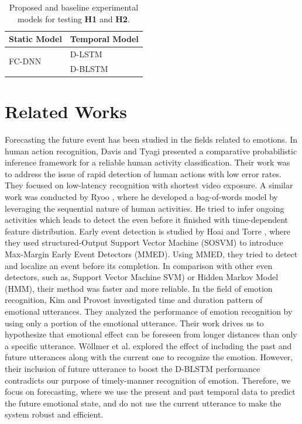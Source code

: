 \begin{table}[h]
\centering
\caption{Proposed and baseline experimental models for testing \textbf{H1} and \textbf{H2}.}
\begin{tabular}{ l l}
\hline
\textbf{Static Model } & \textbf{Temporal Model} \\
\hline
\hline
\multirow{2}{*}{FC-DNN} & D-LSTM \\
          & D-BLSTM \\
\hline
\end{tabular}
\label{table:models}
\end{table}

\newpage
\section{Related Works}
\label{related_works}
Forecasting the future event has been studied in the fields related to emotions. In human action recognition, Davis and  Tyagi \cite{Davis:2006:MHA:1709251.1709302} presented a comparative probabilistic inference framework for a reliable human activity classification. Their work was to address the issue of rapid detection of human actions with low error rates. They focused on low-latency recognition with shortest video exposure. A similar work was conducted by Ryoo \cite{Ryoo:2011:HAP:2355573.2356280}, where he developed a bag-of-words model by leveraging the sequential nature of human activities. He tried to infer ongoing activities which leads to detect the even before it finished with time-dependent feature distribution. Early event detection is studied by Hoai and Torre \cite{MMED}, where they used structured-Output Support Vector Machine (SOSVM) to introduce Max-Margin Early Event Detectors (MMED). Using MMED, they tried to detect and localize an event before its completion. In comparison with other even detectors, such as, Support Vector Machine SVM) or Hidden Markov Model (HMM), their method was faster and more reliable. In the field of emotion recognition, Kim and Provost \cite{Kim2016EmotionSD} investigated time and duration pattern of emotional utterances. They analyzed the performance of emotion recognition by using only a portion of the emotional utterance. Their work drives us to hypothesize that emotional effect can be foreseen from longer distances than only a specific utterance. W\"{o}llmer et al. \cite{Meta2} explored the effect of including the past and future utterances along with the current one to recognize the emotion. However, their inclusion of future utterance to boost the D-BLSTM performance contradicts our purpose of timely-manner recognition of emotion. Therefore, we focus on forecasting, where we use the present and past temporal data to predict the future emotional state, and do not use the current utterance to make the system robust and efficient. 

